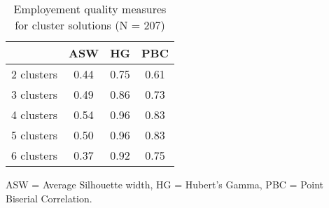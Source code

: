 \begin{table}[htp]
\footnotesize
\setlength{\tabcolsep}{35pt}
\renewcommand{\arraystretch}{1.3}
\begin{threeparttable}
\centering
\caption{Employement quality measures for cluster solutions (N = 207)} 
\label{tab:quality_clusters_job}
\begin{tabular}{lccc}
  \hline
 & ASW & HG & PBC \\ 
  \hline
2 clusters & 0.44 & 0.75 & 0.61 \\ 
  3 clusters & 0.49 & 0.86 & 0.73 \\ 
  4 clusters & 0.54 & 0.96 & 0.83 \\ 
  5 clusters & 0.50 & 0.96 & 0.83 \\ 
  6 clusters & 0.37 & 0.92 & 0.75 \\ 
   \hline
\end{tabular}
\begin{tablenotes}
\scriptsize
\item ASW = Average Silhouette width, HG = Hubert's Gamma, PBC = Point Biserial Correlation.
\end{tablenotes}
\end{threeparttable}
\end{table}
